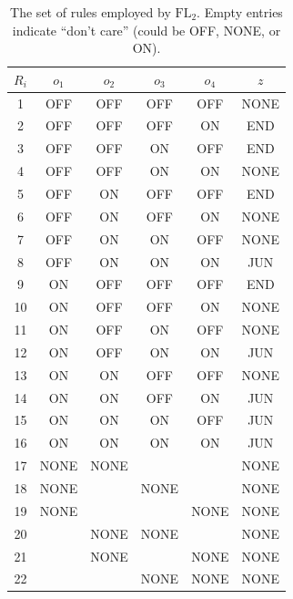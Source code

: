 \begin{table}[!t]
	\caption{The set of rules employed by $\mathrm{FL}_{2}$. Empty entries indicate ``don't care'' (could be OFF, NONE, or ON).}
	\label{tab:rules-FL2}
	\centering
	\begin{tabular}{c | c c c c | c }
		$R_{i}$ & $o_{1}$   & $o_{2}$   & $o_{3}$   & $o_{4}$  & $z$ \\
		\hline
		1 & OFF  & OFF  & OFF  & OFF & NONE \\
		2 & OFF  & OFF  & OFF  & ON  & END  \\
		3 & OFF  & OFF  & ON   & OFF & END  \\
		4 & OFF  & OFF  & ON   & ON  & NONE \\
		\hline
		5 & OFF  & ON   & OFF  & OFF & END  \\
		6 & OFF  & ON   & OFF  & ON  & NONE \\
		7 & OFF  & ON   & ON   & OFF & NONE \\
		8 & OFF  & ON   & ON   & ON  & JUN  \\
		\hline
		9 & ON   & OFF  & OFF  & OFF & END  \\
		10&ON   & OFF  & OFF  & ON  & NONE  \\
		11&ON   & OFF  & ON   & OFF & NONE  \\
		12&ON   & OFF  & ON   & ON  & JUN  \\
		\hline
		13&ON   & ON   & OFF  & OFF & NONE  \\
		14&ON   & ON   & OFF  & ON  & JUN  \\
		15&ON   & ON   & ON   & OFF & JUN  \\
		16&ON   & ON   & ON   & ON  & JUN  \\
		\hline
		17&NONE & NONE &      &      & NONE \\
		18&NONE &      & NONE &      & NONE \\
		19&NONE &      &      & NONE & NONE \\
		20&     & NONE & NONE &      & NONE \\
		21&     & NONE &      & NONE & NONE \\
		22&     &      & NONE & NONE & NONE \\     
	\end{tabular}
\end{table}

